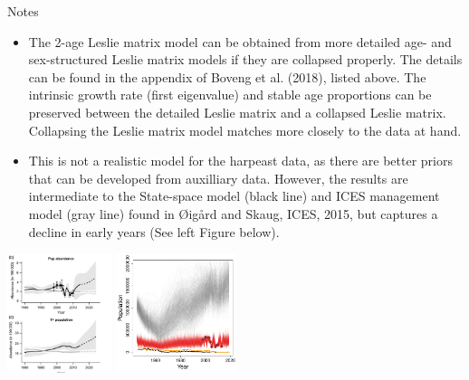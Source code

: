 \documentclass[mathserif,compress]{beamer}
\begin{document}

\begin{frame}
Notes

\begin{itemize}

  \item The 2-age Leslie matrix model can be obtained from more detailed age- and sex-structured Leslie matrix models if they are collapsed properly.  The details can be found in the appendix of Boveng et al. (2018), listed above.  The intrinsic growth rate (first eigenvalue) and stable age proportions can be preserved between the detailed Leslie matrix and a collapsed Leslie matrix.  Collapsing the Leslie matrix model matches more closely to the data at hand.
       
\end{itemize}

\end{frame}


\begin{frame}

\begin{itemize}

  \item This is not a realistic model for the harpeast data, as there are better priors that can be developed from auxilliary data.  However, the results are intermediate to the State-space model (black line) and ICES management model (gray line) found in {{\O}ig{\aa}rd and Skaug}, ICES, 2015, but captures a decline in early years (See left Figure below).

\end{itemize}

\begin{center}
	\includegraphics[height=3.5cm]{figure/Tor-Arne_ICES_2015_figure2.png}
  \includegraphics[height=3.5cm]{figure/Pop_traj} 
\end{center}

\end{frame}
\end{document}
